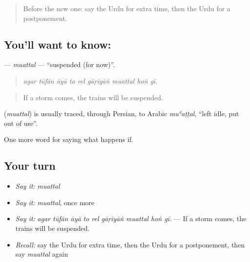 \label{lesson:UR-C525-muattal}



\begin{quote}
Before the new one: say the Urdu for extra time, then the Urdu for a postponement.
\end{quote}

\subsection*{You'll want to know: }
\textbf{} — \emph{muattal} — \textquotedblleft{}suspended (for now)\textquotedblright{}.

\begin{quote}
        
\end{quote}

\begin{quote}
\emph{agar tūfān āyā to rel gāṛiyāṅ muattal hoṅ gī.}
\end{quote}

\begin{quote}
If a storm comes, the trains will be suspended.
\end{quote}

\begin{cousinweb}
\textbf{} (\emph{muattal}) is usually traced, through Persian, to Arabic \emph{muʿaṭṭal}, \textquotedblleft{}left idle, put out of use\textquotedblright{}.
\end{cousinweb}

\begin{grammarlens}[title={What you've built}]
One more word for saying what happens if.
\end{grammarlens}

\subsection*{Your turn}
\begin{itemize}
\raggedright
  \item \emph{Say it:} \emph{muattal}
  \item \emph{Say it:} \emph{muattal}, once more
  \item \emph{Say it:} \emph{agar tūfān āyā to rel gāṛiyāṅ muattal hoṅ gī.} — If a storm comes, the trains will be suspended.
  \item \emph{Recall:} say the Urdu for extra time, then the Urdu for a postponement, then say \emph{muattal} again
\end{itemize}

